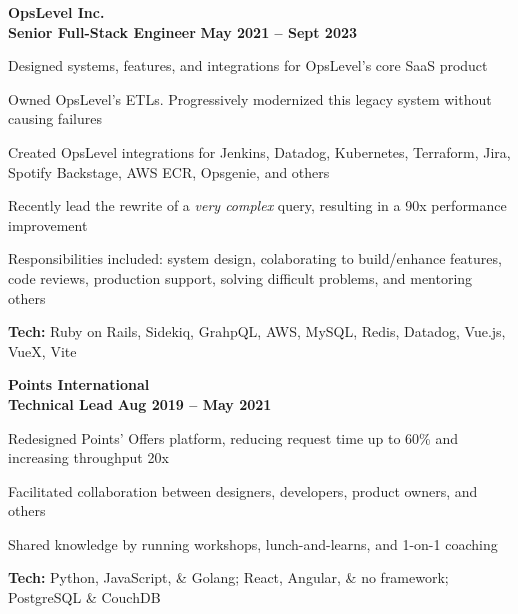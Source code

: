 \documentclass[margin,line]{resume}
\begin{document}
\begin{resume}
    \hspace{-3mm}\textbf{\listing OpsLevel Inc.} \vspace{3mm}\\\vspace{1mm}
    \hspace{1.2mm}\textbf{Senior Full-Stack Engineer} \hfill \textbf{May 2021 -- Sept 2023}\vspace{1mm}
    \begin{list2}
        \item Designed systems, features, and integrations for OpsLevel's core SaaS product
        \vspace{1mm}
        \item Owned OpsLevel's ETLs. Progressively modernized this legacy system without causing failures
        \vspace{1mm}
        \item Created OpsLevel integrations for Jenkins, Datadog, Kubernetes, Terraform, Jira, Spotify Backstage, AWS ECR, Opsgenie, and others
        \vspace{1mm}
        \item Recently lead the rewrite of a \textit{very complex} query, resulting in a 90x performance improvement
        \vspace{1mm}
        \item Responsibilities included: system design, colaborating to build/enhance features, code reviews, production support, solving difficult problems, and mentoring others
        \vspace{1mm}
        \item\textbf{Tech:} Ruby on Rails, Sidekiq, GrahpQL, AWS, MySQL, Redis, Datadog, Vue.js, VueX, Vite
    \end{list2}

    \hspace{-3mm}\textbf{\listing Points International} \vspace{2mm}\\\vspace{1mm}
    \hspace{1.2mm}\textbf{Technical Lead} \hfill \textbf{Aug 2019 -- May 2021}\vspace{1mm}
    \begin{list2}
        \item Redesigned Points’ Offers platform, reducing request time up to 60\% and increasing throughput 20x
        \vspace{1mm}
        \item Facilitated collaboration between designers, developers, product owners, and others
        \vspace{1mm}
        \item Shared knowledge by running workshops, lunch-and-learns, and 1-on-1 coaching
        \vspace{1mm}
        \item\textbf{Tech:} Python, JavaScript, \& Golang; React, Angular, \& no framework; PostgreSQL \& CouchDB
    \end{list2}


\end{resume}
\end{document}
